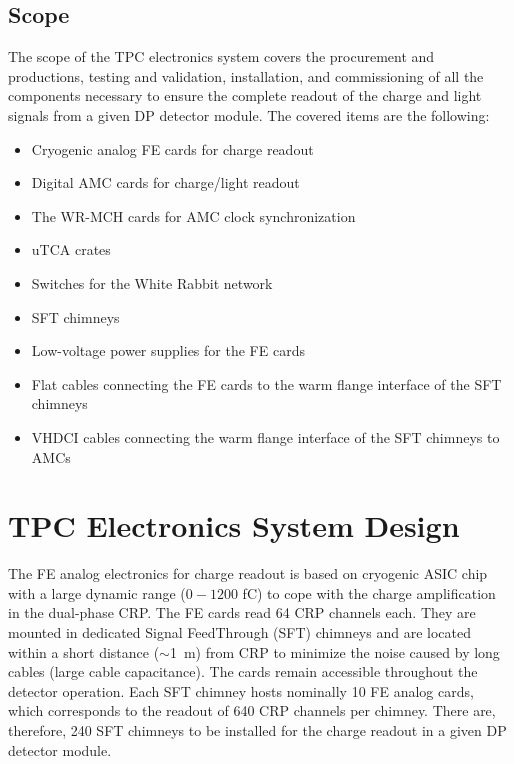 

\subsection{Scope}
\label{sec:fddp-tpc-elec-scope}

The scope of the TPC electronics system covers the procurement and productions, testing and validation, installation, and commissioning of all the components necessary to ensure the complete readout of the charge and light signals from a given DP detector module. The covered items are the following:
\begin{itemize}
\item{Cryogenic analog FE cards for charge readout}
\item{Digital AMC cards for charge/light readout}
\item{The WR-MCH cards for AMC clock synchronization}
\item{uTCA crates}
\item{Switches for the White Rabbit network}
\item{SFT chimneys}
\item{Low-voltage power supplies for the FE cards}
\item{Flat cables connecting the FE cards to the warm flange interface of the SFT chimneys}
\item{VHDCI cables connecting the warm flange interface of the SFT chimneys to AMCs}
\end{itemize}



\section{TPC Electronics System Design}
\label{sec:fddp-tpc-elec-design}

The FE analog electronics for charge readout is based on cryogenic ASIC chip with a large dynamic range ($0-1200$ \si{fC}) to cope with the charge amplification in the dual-phase CRP. The FE cards read \num{64} CRP channels each. They are mounted in dedicated Signal FeedThrough (SFT) chimneys and are located within a short distance ($\sim$\SI{1}{\metre}) from CRP to minimize the noise caused by long cables (large cable capacitance). The cards remain accessible throughout the detector operation. Each SFT chimney hosts nominally \num{10} FE analog cards, which corresponds to the readout of \num{640} CRP channels per chimney. There are, therefore, \num{240} SFT chimneys to be installed for the charge readout in a given DP detector module.   

